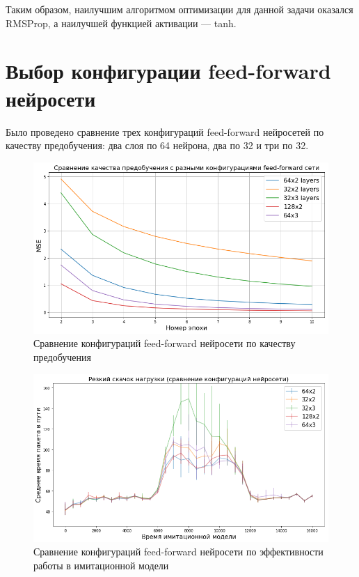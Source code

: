 \documentclass[specification, annotation]{itmo-student-thesis}
\begin{document}
Таким образом, наилучшим алгоритмом оптимизации для данной задачи оказался
RMSProp, а наилучшей функцией активации --- tanh.

\section{Выбор конфигурации feed-forward нейросети}

Было проведено сравнение трех конфигураций feed-forward нейросетей по качеству
предобучения: два слоя по 64 нейрона, два по 32 и три по 32.

\begin{figure}[!h]
  \caption{Сравнение конфигураций feed-forward нейросети по качеству
    предобучения}\label{experiment-layers-pretrain}
  \centering
  \includegraphics[scale=0.6]{experiment-layers-pretrain}
\end{figure}

\begin{figure}[!h]
  \caption{Сравнение конфигураций feed-forward нейросети по эффективности работы
    в имитационной модели}\label{experiment-layers-launch}
  \centering
  \includegraphics[scale=0.6]{experiment-layers-launch}
\end{figure}
\end{document}
